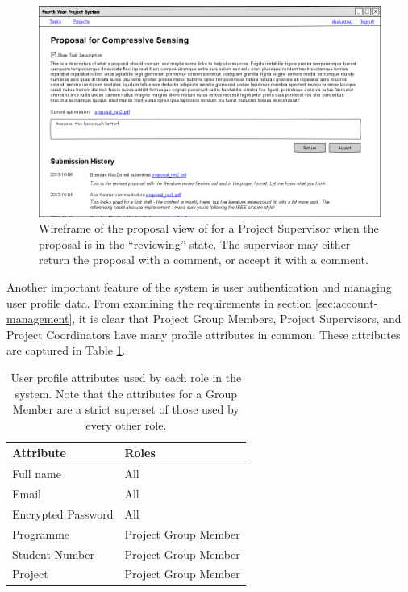 \documentclass[document.tex]{subfiles}
\begin{document}
\begin{figure}[!htbp]
\centering \includegraphics[width=6in]{./img/case-study-fourth-year-system/supervisor-proposal-view_wireframe}
\caption{Wireframe of the proposal view of for a Project Supervisor when the proposal is in the ``reviewing'' state. The supervisor may either return the proposal with a comment, or accept it with a comment.}
\label{fig:wireframe-supervisor-proposal-view}
\end{figure}

Another important feature of the system is user authentication and managing user profile data. From examining the requirements in section \ref{sec:account-management}, it is clear that Project Group Members, Project Supervisors, and Project Coordinators have many profile attributes in common. These attributes are captured in Table \ref{tbl:user-profile-attributes}.

\begin{table}
  \centering
  \caption{User profile attributes used by each role in the system. Note that the attributes for a Group Member are a strict superset of those used by every other role.}
  \label{tbl:user-profile-attributes}
  \tablespacer
  \begin{tabular}{ l l }
    \toprule
    Attribute & Roles \\
    \midrule
    Full name & All \\
    Email & All \\
    Encrypted Password & All \\
    Programme & Project Group Member \\
    Student Number & Project Group Member \\
    Project & Project Group Member \\
    \bottomrule
  \end{tabular}
\end{table}
\end{document}
